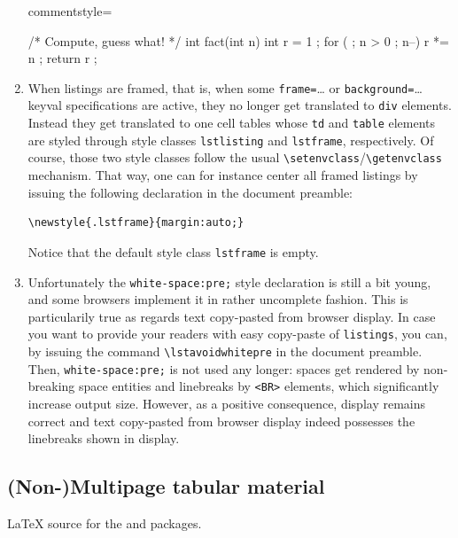 \begin{enumerate}
{commentstyle={\em\color{magenta}}}%
{\lstset{language=C, style=colors}}
{}
\begin{clisting}
/* Compute, guess what! */
int fact(int n) {
  int r = 1 ;
  for ( ; n > 0 ; n--) {
    r *= n ;
  }
  return r ;
}
\end{clisting}
\endgroup\fi
\item When listings are framed, that is, when  some
\texttt{frame=}\ldots{} or \texttt{background=}\ldots{} keyval
specifications are active, they no longer get translated to \verb+div+
elements.
Instead they get translated to one cell tables whose \verb+td+
and \verb+table+ elements
are styled through style classes \texttt{lstlisting} and
\texttt{lstframe}, respectively. Of course, those two style classes
follow the usual \verb+\setenvclass+/\verb+\getenvclass+ mechanism.
That way, one can for instance center all framed listings by issuing
the following declaration in the document preamble:
\begin{verbatim}
\newstyle{.lstframe}{margin:auto;}
\end{verbatim}
Notice that the default style class \texttt{lstframe} is empty.

\item {}%
Unfortunately the \verb+white-space:pre;+ style declaration is still a
bit young, and some browsers implement it in rather uncomplete
fashion.  This is particularily true as regards text copy-pasted from
browser display.  In case you want to provide your readers with easy
copy-paste of \texttt{listings}, you can, by issuing the command
\verb+\lstavoidwhitepre+ in the document preamble.  Then,
\verb+white-space:pre;+ is not used any longer: spaces get rendered
by non-breaking space entities and linebreaks by \verb+<BR>+ elements,
which significantly increase output size.  However, as a positive
consequence, display remains correct and text copy-pasted from browser
display indeed possesses the linebreaks shown in display.
\end{enumerate}


\subsection{(Non-)Multipage tabular material}
%
\ifhevea\LaTeX{} source
for the
and 
packages.\fi

